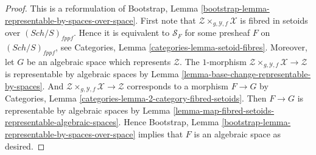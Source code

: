 \documentclass{stacks-project}
\theoremstyle{plain}
\theoremstyle{definition}
\theoremstyle{remark}
\numberwithin{equation}{subsection}
\def\Sch{\mathit{Sch}}
\begin{document}
\begin{proof}
This is a reformulation of
Bootstrap, Lemma \ref{bootstrap-lemma-representable-by-spaces-over-space}.
First note that
$\mathcal{Z} \times_{g, \mathcal{Y}, f} \mathcal{X}$
is fibred in setoids over $(\Sch/S)_{fppf}$.
Hence it is equivalent to $\mathcal{S}_F$ for some presheaf
$F$ on $(\Sch/S)_{fppf}$, see
Categories, Lemma \ref{categories-lemma-setoid-fibres}.
Moreover, let $G$ be an algebraic space which represents
$\mathcal{Z}$. The $1$-morphism
$\mathcal{Z} \times_{g, \mathcal{Y}, f} \mathcal{X} \to \mathcal{Z}$
is representable by algebraic spaces by
Lemma \ref{lemma-base-change-representable-by-spaces}.
And $\mathcal{Z} \times_{g, \mathcal{Y}, f} \mathcal{X} \to \mathcal{Z}$
corresponds to a morphism $F \to G$ by
Categories, Lemma \ref{categories-lemma-2-category-fibred-setoids}.
Then $F \to G$ is representable by algebraic spaces by
Lemma \ref{lemma-map-fibred-setoids-representable-algebraic-spaces}.
Hence
Bootstrap, Lemma \ref{bootstrap-lemma-representable-by-spaces-over-space}
implies that $F$ is an algebraic space as desired.
\end{proof}
\end{document}
